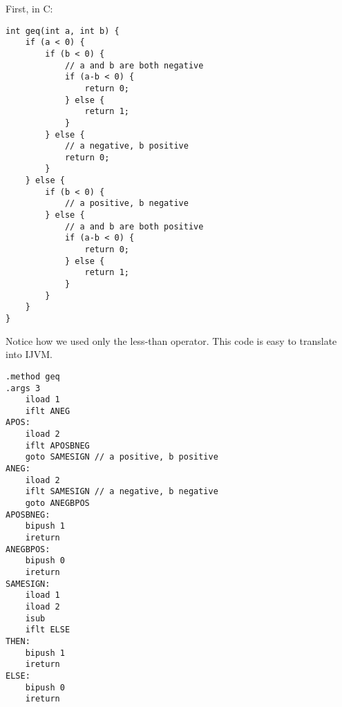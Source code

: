 \documentclass[12pt,a4paper]{article}
\begin{document}
First, in C:

\lstset{language=C}
\begin{lstlisting}
int geq(int a, int b) {
	if (a < 0) {
		if (b < 0) {
			// a and b are both negative
			if (a-b < 0) {
				return 0;
			} else {
				return 1;
			}
		} else {
			// a negative, b positive
			return 0;
		}
	} else {
		if (b < 0) {
			// a positive, b negative
		} else {
			// a and b are both positive
			if (a-b < 0) {
				return 0;
			} else {
				return 1;
			}
		}
	}
}
\end{lstlisting}
Notice how we used only the less-than operator. This code is easy to translate into IJVM.
\lstset{language=JVMIS}
\begin{lstlisting}
.method geq
.args 3
	iload 1
	iflt ANEG
APOS:
	iload 2
	iflt APOSBNEG
	goto SAMESIGN // a positive, b positive
ANEG:
	iload 2
	iflt SAMESIGN // a negative, b negative
	goto ANEGBPOS
APOSBNEG:
	bipush 1
	ireturn
ANEGBPOS:
	bipush 0
	ireturn
SAMESIGN:
	iload 1
	iload 2
	isub
	iflt ELSE
THEN:
	bipush 1
	ireturn
ELSE:
	bipush 0
	ireturn
\end{lstlisting}
\end{document}
